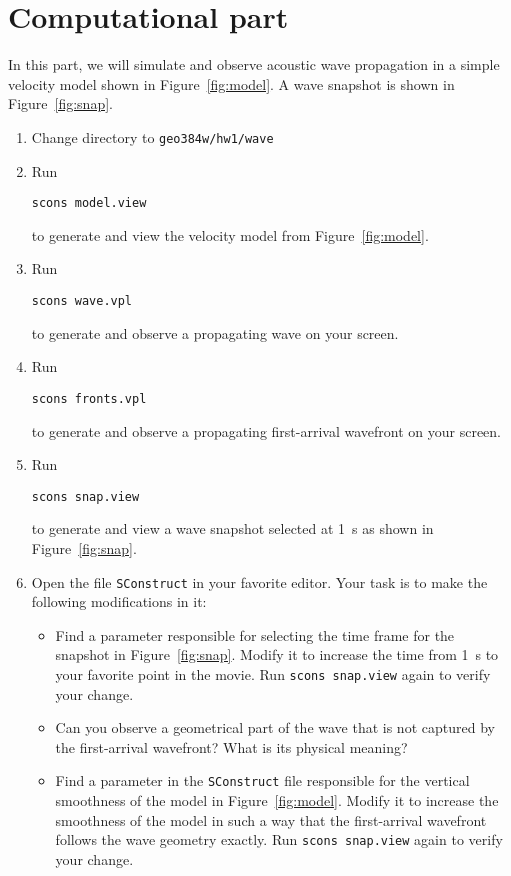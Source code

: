 \section{Computational part}

In this part, we will simulate and observe acoustic wave propagation
in a simple velocity model shown in Figure~\ref{fig:model}. A wave
snapshot is shown in Figure~\ref{fig:snap}.


\begin{enumerate}
\item Change directory to \verb#geo384w/hw1/wave#
\item Run
\begin{verbatim}
scons model.view
\end{verbatim}
to generate and view the velocity model from Figure~\ref{fig:model}.
\item Run
\begin{verbatim}
scons wave.vpl
\end{verbatim}
to generate and observe a propagating wave on your screen.
\item Run
\begin{verbatim}
scons fronts.vpl
\end{verbatim}
to generate and observe a propagating first-arrival wavefront on your screen.
\item Run
\begin{verbatim}
scons snap.view
\end{verbatim}
  to generate and view a wave snapshot selected at 1~s as shown in
  Figure~\ref{fig:snap}.
\item Open the file \texttt{SConstruct} in your favorite editor. Your
  task is to make the following modifications in it:
\begin{itemize}
\item Find a parameter responsible for selecting the time frame for
  the snapshot in Figure~\ref{fig:snap}.  Modify it to increase the
  time from 1~s to your favorite point in the movie.  Run
  \texttt{scons snap.view} again to verify your change.
\item Can you observe a geometrical part of the wave that is not
  captured by the first-arrival wavefront?  What is its physical
  meaning?
\item Find a parameter in the \texttt{SConstruct} file responsible for
  the vertical smoothness of the model in Figure~\ref{fig:model}.
  Modify it to increase the smoothness of the model in such a way that
  the first-arrival wavefront follows the wave geometry exactly.  Run
  \texttt{scons snap.view} again to verify your change.
\end{itemize}
\end{enumerate}


